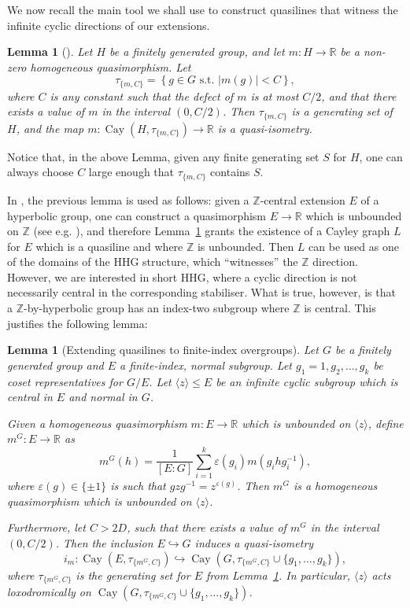 \documentclass[svgnames]{amsart}
\theoremstyle{plain}
\newtheorem{lemma}[thm]{Lemma}
\theoremstyle{definition}
\newcommand{\Z}{\mathbb{Z}}
\newcommand{\Cay}[2]{\operatorname{Cay}\left(#1,#2\right)}
\begin{document}
We now recall the main tool we shall use to construct quasilines that witness the infinite cyclic directions of our extensions.

\begin{lemma}[{\cite[Lemma 4.15]{ABO}}]\label{lem:abo}
    Let $H$ be a finitely generated group, and let $m\colon H\to \mathbb{R}$ be a non-zero homogeneous quasimorphism. Let
$$\tau_{\{m,C\}} =  \left\{g \in G \mbox{ s.t. } |m(g)| < C\right\},$$
where $C$ is any constant such that the defect of $m$ is at most $C/2$, and that there exists a value of $m$ in the interval $(0, C/2)$. Then $\tau_{\{m,C\}}$ is a generating set of $H$, and the map $m\colon \Cay{H}{\tau_{\{m,C\}}} \to \mathbb{R}$ is a quasi-isometry. 
\end{lemma}

Notice that, in the above Lemma, given any finite generating set $S$ for $H$, one can always choose $C$ large enough that $\tau_{\{m,C\}}$ contains $S$.

In \cite{HRSS_3manifold, ELTAG_HHS}, the previous lemma is used as follows: given a $\Z$-central extension $E$ of a hyperbolic group, one can construct a quasimorphism $E\to \mathbb{R}$ which is unbounded on $\Z$ (see e.g. \cite[Lemma 4.3]{ELTAG_HHS}), and therefore Lemma~\ref{lem:abo} grants the existence of a Cayley graph $L$ for $E$ which is a quasiline and where $\Z$ is unbounded. Then $L$ can be used as one of the domains of the HHG structure, which “witnesses” the $\Z$ direction. However, we are interested in short HHG, where a cyclic direction is not necessarily central in the corresponding stabiliser. What is true, however, is that a $\Z$-by-hyperbolic group has an index-two subgroup where $\Z$ is central. This justifies the following lemma:

\begin{lemma}[Extending quasilines to finite-index overgroups]\label{lem:quasiline_extension}
    Let $G$ be a finitely generated group and $E$ a finite-index, normal subgroup. Let $g_1=1,g_2,\ldots, g_k$ be coset representatives for $G/E$. Let $\langle z\rangle\le E$ be an infinite cyclic subgroup which is central in $E$ and normal in $G$. 
    
    Given a homogeneous quasimorphism $m\colon E\to \mathbb{R}$ which is unbounded on $\langle z\rangle$, define $m^G\colon E\to \mathbb{R}$ as
    $$m^G(h)=\frac{1}{[E:G]}\sum_{i=1}^k\varepsilon(g_i) m(g_ihg_i^{-1}),$$
    where $\varepsilon(g)\in\{\pm1\}$ is such that $gz g^{-1}=z^{\varepsilon(g)}$. Then $m^G$ is a homogeneous quasimorphism which is unbounded on $\langle z\rangle$.
    
    Furthermore, let $C>2D$, such that there exists a value of $m^G$ in the interval $(0, C/2)$. Then the inclusion $E\hookrightarrow G$ induces a quasi-isometry
    $$i_m\colon \Cay{E}{\tau_{\{m^G,C\}}}\hookrightarrow \Cay{G}{\tau_{\{m^G,C\}}\cup\{g_1,\ldots, g_k\}},$$
    where $\tau_{\{m^G,C\}}$ is the generating set for $E$ from  Lemma~\ref{lem:abo}. In particular, $\langle z\rangle$ acts loxodromically on $\Cay{G}{\tau_{\{m^G,C\}}\cup\{g_1,\ldots, g_k\}}$.
\end{lemma}
\end{document}

